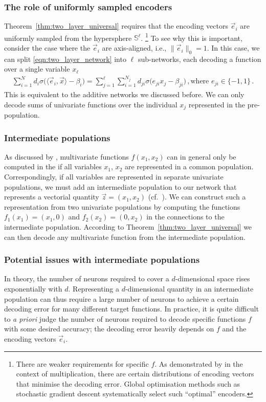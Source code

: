 \subsubsection{The role of uniformly sampled encoders}
Theorem~\ref{thm:two_layer_universal} requires that the encoding vectors $\vec e_i$ are uniformly sampled from the hypersphere $\mathbb{S}^\ell$.%
\footnote{There are weaker requirements for specific $f$.
As demonstrated by \citet{gosmann2015precise} in the context of multiplication, there are certain distributions of encoding vectors that minimise the decoding error.
Global optimisation methods such as stochastic gradient descent systematically select such \enquote{optimal} encoders.}
To see why this is important, consider the case where the $\vec e_i$ are axis-aligned, i.e., $\|\vec e_i\|_0 = 1$.
In this case, we can split \cref{eqn:two_layer_network} into $\ell$ sub-networks, each decoding a function over a single variable $x_\ell$
\begin{align*}
		\sum_{i = 1}^N d_i \sigma\bigl( \langle \vec e_i, \vec x \rangle - \beta_i \bigr)
	= 	\sum_{j = 1}^\ell \sum_{i = 1}^{N_j} d_{j i} \sigma\bigl( e_{j i} x_j - \beta_{j i} \bigr) \,, \text{where } e_{j i} \in \{ -1, 1\} \,.
\end{align*}
This is equivalent to the additive networks we discussed before.
We can only decode sums of univariate functions over the individual $x_j$ represented in the pre-population.

\subsubsection{Intermediate populations}
As discussed by \citet[Chapter~6]{eliasmith2003neural}, multivariate functions $f(x_1, x_2)$ can in general only be computed in the \NEF if all variables $x_1$, $x_2$ are represented in a common population.
Correspondingly, if all variables are represented in separate univariate populations, we must add an intermediate population to our network that represents a vectorial quantity $\vec z = (x_1, x_2)$ (cf.~).
We can construct such a representation from two univariate populations by computing the functions $f_1(x_1) = (x_1, 0)$ and $f_2(x_2) = (0, x_2)$ in the connections to the intermediate population.
According to Theorem~\ref{thm:two_layer_universal} we can then decode any multivariate function from the intermediate population.

\subsubsection{Potential issues with intermediate populations}
In theory, the number of neurons required to cover a $d$-dimensional space rises exponentially with $d$.
Representing a $d$-dimensional quantity in an intermediate population can thus require a large number of neurons to achieve a certain decoding error for many different target functions.
In practice, it is quite difficult to \emph{a priori} judge the number of neurons required to decode specific functions $f$ with some desired accuracy; the decoding error heavily depends on $f$ and the encoding vectors $\vec e_i$.

